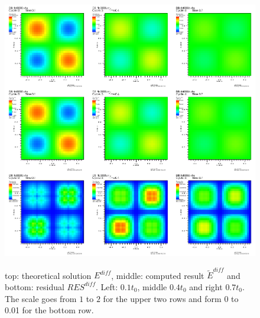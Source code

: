 \begin{figure}
\includegraphics[width = \textwidth]{visit0001.png}
\label{fig: test_diffusion}
\caption{top: theoretical solution $E^{diff}$, middle: computed result $\tilde{E}^{diff}$ and bottom: residual $RES^{diff}$. Left: $0.1 t_0$, middle $0.4 t_0$ and right $0.7 t_0$. The scale goes from $1$ to $2$ for the upper two rows and form 0 to 0.01 for the bottom row.}
\end{figure}

